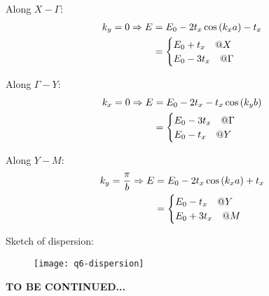 \begin{parts}
	Along $X - \Gamma$:
	\begin{align*}
		k_y = 0 \Rightarrow E &= E_0 - 2t_x \cos\left(k_x a\right) - t_x \\
		&= \begin{cases}
			E_0 + t_x \textnormal{\hspace{1em}@$X$} \\
			E_0 - 3t_x \textnormal{\hspace{1em}@$\Gamma$}
		\end{cases}
	\end{align*}
	
	Along $\Gamma - Y$:
	\begin{align*}
		k_x = 0 \Rightarrow E &= E_0 -2t_x - t_x \cos\left(k_y b\right) \\
		&= \begin{cases}
			E_0 - 3t_x \textnormal{\hspace{1em}@$\Gamma$} \\
			E_0 - t_x \textnormal{\hspace{1em}@$Y$}
		\end{cases}
	\end{align*}
	
	Along $Y - M$:
	\begin{align*}
		k_y = \frac{\pi}{b} \Rightarrow E &= E_0 - 2t_x \cos\left(k_x a\right) + t_x \\
		&= \begin{cases}
			E_0 - t_x \textnormal{\hspace{1em}@$Y$} \\
			E_0 + 3t_x \textnormal{\hspace{1em}@$M$}
		\end{cases}
	\end{align*}
	
	Sketch of dispersion:
	\begin{figure}[H]
		\centering
		\texttt{[image: q6-dispersion]}
	\end{figure}
	
	\textbf{\color{red}TO BE CONTINUED...}
\end{parts}